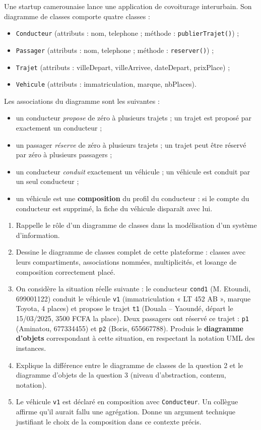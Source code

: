 \documentclass[11pt]{article}
\begin{document}
\begin{exercice}
Une startup camerounaise lance une application de covoiturage interurbain. Son diagramme de classes comporte quatre classes :
\begin{itemize}
  \item \texttt{Conducteur} (attributs : nom, telephone ; méthode : \texttt{publierTrajet()}) ;
  \item \texttt{Passager} (attributs : nom, telephone ; méthode : \texttt{reserver()}) ;
  \item \texttt{Trajet} (attributs : villeDepart, villeArrivee, dateDepart, prixPlace) ;
  \item \texttt{Vehicule} (attributs : immatriculation, marque, nbPlaces).
\end{itemize}
Les associations du diagramme sont les suivantes :
\begin{itemize}
  \item un conducteur \emph{propose} de zéro à plusieurs trajets ; un trajet est proposé par exactement un conducteur ;
  \item un passager \emph{réserve} de zéro à plusieurs trajets ; un trajet peut être réservé par zéro à plusieurs passagers ;
  \item un conducteur \emph{conduit} exactement un véhicule ; un véhicule est conduit par un seul conducteur ;
  \item un véhicule est une \textbf{composition} du profil du conducteur : si le compte du conducteur est supprimé, la fiche du véhicule disparaît avec lui.
\end{itemize}
\begin{enumerate}
  \item Rappelle le rôle d'un diagramme de classes dans la modélisation d'un système d'information.
  \item Dessine le diagramme de classes complet de cette plateforme : classes avec leurs compartiments, associations nommées, multiplicités, et losange de composition correctement placé.
  \item On considère la situation réelle suivante : le conducteur \texttt{cond1} (M. Etoundi, 699001122) conduit le véhicule \texttt{v1} (immatriculation « LT 452 AB », marque Toyota, 4 places) et propose le trajet \texttt{t1} (Douala -- Yaoundé, départ le 15/03/2025, \num{3500} FCFA la place). Deux passagers ont réservé ce trajet : \texttt{p1} (Aminatou, 677334455) et \texttt{p2} (Boris, 655667788). Produis le \textbf{diagramme d'objets} correspondant à cette situation, en respectant la notation UML des instances.
  \item Explique la différence entre le diagramme de classes de la question 2 et le diagramme d'objets de la question 3 (niveau d'abstraction, contenu, notation).
  \item Le véhicule \texttt{v1} est déclaré en composition avec \texttt{Conducteur}. Un collègue affirme qu'il aurait fallu une agrégation. Donne un argument technique justifiant le choix de la composition dans ce contexte précis.
\end{enumerate}
\end{exercice}
\end{document}
